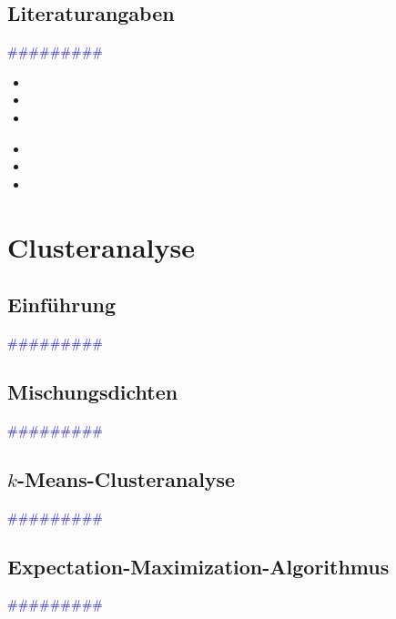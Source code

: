 \documentclass{article}
\begin{document}
  \subsection{Literaturangaben} %
      \textcolor{blue}{\#\#\#\#\#\#\#\#\#}

      \begin{itemize}
      \color{red}
        \item
        \item
        \item
      \end{itemize}


      \begin{itemize}
      \color{ForestGreen}
        \item
        \item
        \item
      \end{itemize}



\newpage
\section{Clusteranalyse} %
  \subsection{Einführung} %
      \textcolor{blue}{\#\#\#\#\#\#\#\#\#}
  \subsection{Mischungsdichten} %
      \textcolor{blue}{\#\#\#\#\#\#\#\#\#}
  \subsection{$k$-Means-Clusteranalyse} %
      \textcolor{blue}{\#\#\#\#\#\#\#\#\#}
  \subsection{Expectation-Maximization-Algorithmus} %
      \textcolor{blue}{\#\#\#\#\#\#\#\#\#}
\end{document}
